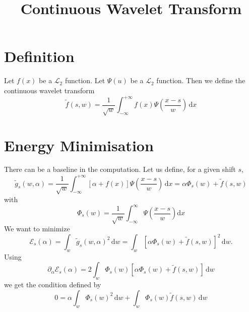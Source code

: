 \documentclass{revtex4}
\begin{document}
	\title{Continuous Wavelet Transform}
	\maketitle

\section{Definition}
Let $f(x)$ be a $\mathcal{L}_2$ function. Let $\Psi(u)$ be a $\mathcal{L}_2$ function.
Then we define the continuous wavelet transform
\begin{equation}
	\tilde{f}(s,w) = \dfrac{1}{\sqrt{w}}
	\int_{-\infty}^{+\infty} f(x)\Psi\left(\dfrac{x-s}{w}\right) \, \mathrm{d}x
\end{equation}

\section{Energy Minimisation}
There can be a baseline in the computation. Let us define, for a given shift $s$,
\begin{equation}
	\tilde{g}_s(w,\alpha) = \dfrac{1}{\sqrt{w}}
	\int_{-\infty}^{+\infty} \left[\alpha + f(x) \right]\Psi\left(\dfrac{x-s}{w}\right) \, \mathrm{d}x
	= \alpha \Phi_s(w) + \tilde{f}(s,w) 
\end{equation}
with
\begin{equation}
	\Phi_s(w) = \dfrac{1}{\sqrt{w}} \int_{-\infty}^{\infty} \Psi\left(\dfrac{x-s}{w}\right) \mathrm{d}x
\end{equation}
We want to minimize
\begin{equation}
	\mathcal{E}_s(\alpha) = \int_w \tilde{g}_s(w,\alpha)^2 \,\mathrm{d}w 
	= \int_w  \left[\alpha \Phi_s(w) + \tilde{f}(s,w)\right]^2 \,\mathrm{d}w.
\end{equation}
Using 
\begin{equation}
	\partial_\alpha \mathcal{E}_s(\alpha) = 2 \int_w \Phi_s(w) \left[ \alpha \Phi_s(w) + \tilde{f}(s,w) \right]\,\mathrm{d}w
\end{equation}
we get the condition defined by
\begin{equation}
		0 = \alpha \int_w \Phi_s(w)^2 \,\mathrm{d}w + \int_w \Phi_s(w) \tilde{f}(s,w) \,\mathrm{d}w
\end{equation}
\end{document}
